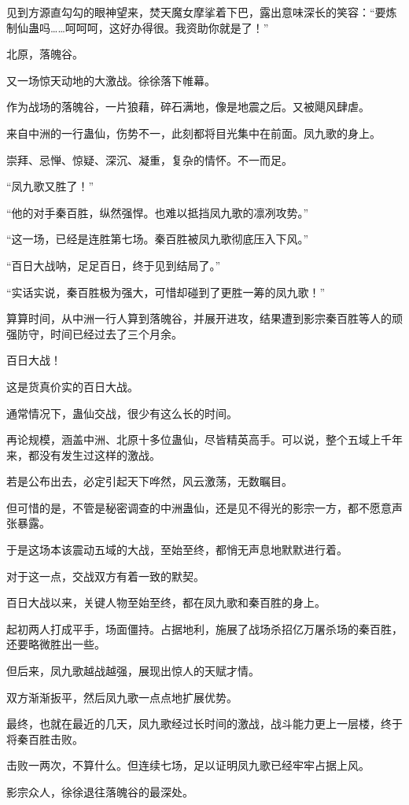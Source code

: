 \begin{this_body}
见到方源直勾勾的眼神望来，焚天魔女摩挲着下巴，露出意味深长的笑容：“要炼制仙蛊吗……呵呵呵，这好办得很。我资助你就是了！”

北原，落魄谷。

又一场惊天动地的大激战。徐徐落下帷幕。

作为战场的落魄谷，一片狼藉，碎石满地，像是地震之后。又被飓风肆虐。

来自中洲的一行蛊仙，伤势不一，此刻都将目光集中在前面。凤九歌的身上。

崇拜、忌惮、惊疑、深沉、凝重，复杂的情怀。不一而足。

“凤九歌又胜了！”

“他的对手秦百胜，纵然强悍。也难以抵挡凤九歌的凛冽攻势。”

“这一场，已经是连胜第七场。秦百胜被凤九歌彻底压入下风。”

“百日大战呐，足足百日，终于见到结局了。”

“实话实说，秦百胜极为强大，可惜却碰到了更胜一筹的凤九歌！”

算算时间，从中洲一行人算到落魄谷，并展开进攻，结果遭到影宗秦百胜等人的顽强防守，时间已经过去了三个月余。

百日大战！

这是货真价实的百日大战。

通常情况下，蛊仙交战，很少有这么长的时间。

再论规模，涵盖中洲、北原十多位蛊仙，尽皆精英高手。可以说，整个五域上千年来，都没有发生过这样的激战。

若是公布出去，必定引起天下哗然，风云激荡，无数瞩目。

但可惜的是，不管是秘密调查的中洲蛊仙，还是见不得光的影宗一方，都不愿意声张暴露。

于是这场本该震动五域的大战，至始至终，都悄无声息地默默进行着。

对于这一点，交战双方有着一致的默契。

百日大战以来，关键人物至始至终，都在凤九歌和秦百胜的身上。

起初两人打成平手，场面僵持。占据地利，施展了战场杀招亿万屠杀场的秦百胜，还要略微胜出一些。

但后来，凤九歌越战越强，展现出惊人的天赋才情。

双方渐渐扳平，然后凤九歌一点点地扩展优势。

最终，也就在最近的几天，凤九歌经过长时间的激战，战斗能力更上一层楼，终于将秦百胜击败。

击败一两次，不算什么。但连续七场，足以证明凤九歌已经牢牢占据上风。

影宗众人，徐徐退往落魄谷的最深处。


\end{this_body}
